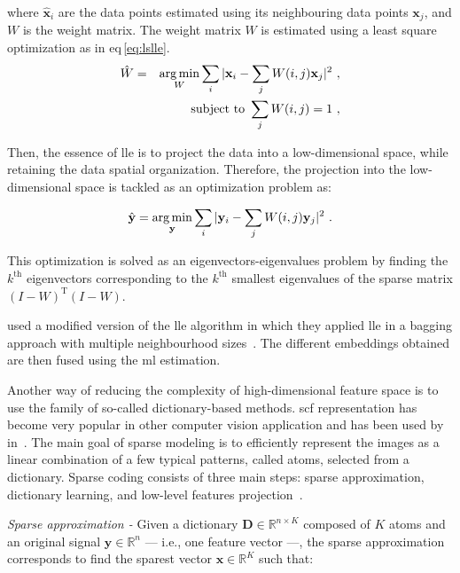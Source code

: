 \noindent where $\hat{\mathbf{x}}_i$ are the data points estimated using its neighbouring data points $\mathbf{x}_j$, and $W$ is the weight matrix.
The weight matrix $W$ is estimated using a least square optimization as in \acs{eq}\,\eqref{eq:lslle}.
\begin{eqnarray}
	\hat{W} & = & \operatorname*{arg\,min}_{W} \sum_i | \mathbf{x}_i - \sum_j W(i,j)\mathbf{x}_j |^{2} \ , \label{eq:lslle} \\
	&& \text{subject to } \sum_j W(i,j) = 1 \ , \nonumber
\end{eqnarray}

Then, the essence of \ac{lle} is to project the data into a low-dimensional space, while retaining the data spatial organization.
Therefore, the projection into the low-dimensional space is tackled as an optimization problem as:

\begin{equation}
	\hat{\mathbf{y}} = \operatorname*{arg\,min}_{\mathbf{y}} \sum_i | \mathbf{y}_i - \sum_j W(i,j)\mathbf{y}_j |^{2} \ .
	\label{eq:lowprojlle}
\end{equation}

This optimization is solved as an eigenvectors-eigenvalues problem by finding the $k^{\text{th}}$ eigenvectors corresponding to the $k^{\text{th}}$ smallest eigenvalues of the sparse matrix $(I-W)^{\text{T}}(I-W)$.

\citeauthor{Tiwari2008} used a modified version of the \ac{lle} algorithm in which they applied \ac{lle} in a bagging approach with multiple neighbourhood sizes~\cite{Tiwari2008}.
The different embeddings obtained are then fused using the \ac{ml} estimation.

Another way of reducing the complexity of high-dimensional feature space is to use the family of so-called dictionary-based methods.
\Ac{scf} representation has become very popular in other computer vision application and has been used by \citeauthor{lehaire2014computer} in~\cite{lehaire2014computer}.
The main goal of sparse modeling is to efficiently represent the images as a linear combination of a few typical patterns, called atoms, selected from a dictionary.
Sparse coding consists of three main steps: sparse approximation, dictionary learning, and low-level features projection~\cite{rubinstein2008efficient}.

\emph{Sparse approximation -} Given a dictionary $\mathbf{D} \in \mathbb{R}^{n \times K}$ composed of $K$ atoms and an original signal $\mathbf{y} \in \mathbb{R}^{n}$ --- i.e., one feature vector ---, the sparse approximation corresponds to find the sparest vector $\mathbf{x} \in \mathbb{R}^{K}$ such that:

